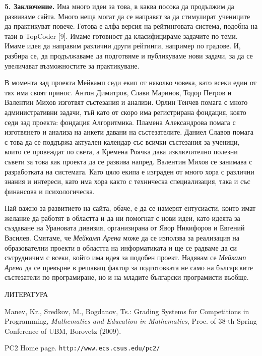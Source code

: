 \documentclass[11pt]{article}
\begin{document}
\textbf{5. Заключение.} Има много идеи за това, в каква посока да
продължим да развиваме сайта. Много неща могат да се направят за да
стимулират учениците да практикуват повече. Готова е алфа версия на
рейтинговата система, подобна на тази в TopCoder [9]. Имаме
готовност да класифицираме задачите по теми. Имаме идея да направим
различни други рейтинги, например по градове. И, разбира се, да
продължаваме да подготвяме и публикуваме нови задачи, за да се
увеличават възможностите за практикуване.

В момента зад проекта Мейкамп седи екип от няколко човека, като всеки
един от тях има своят принос. Антон Димитров, Слави Маринов, Тодор Петров
и Валентин Михов изготвят състезания и анализи. Орлин Тенчев помага с много
административни задачи, тъй като от скоро има регистрирана фондация, която
седи зад проекта: фондация Алгоритмика. Пламена Александрова помага с
изготвянето и анализа на анкети давани на състезателите. Даниел Славов помага с това да се поддържа актуален календар със всички състезания за ученици, които се провеждат по света, а Кремена Роячка дава изключително полезни съвети за това как проекта да се развива напред. Валентин Михов се занимава с разработката на системата. Като цяло екипа е изграден от много хора с различни знания и интереси, като има хора както с техническа специализация, така и със финансова и психологическа.

Най-важно за развитието на сайта, обаче, е да се намерят ентусиасти,
които имат желание да работят в областта и да ни помогнат с нови
идеи, като идеята за създаване на Урановата дивизия, организирана от Явор Никифоров и Евгений Василев.
Смятаме, че \textit{Мейкамп Арена} може да се използва за реализация
на образователни проекти в областта на информатиката и ще се радваме
да си сътрудничим с всеки, който има идея за подобен проект. Надявам
се \textit{Мейкамп Арена} да се превърне в решаващ фактор за
подготовката не само на българските състезатели по програмиране, но
и на младите български програмисти въобще.

\begin{center}

ЛИТЕРАТУРА

\end{center}

\noindent [1] Manev, Kr.,  Sredkov, M., Bogdanov, Ts.: Grading
Systems for Competiti\-ons in Programming, \textit{Mathematics and
Education in Mathematics}, Proc. of 38-th Spring Conference of UBM,
Borovetz (2009).

\noindent [2] PC2 Home page. \texttt{http://www.ecs.csus.edu/pc2/}
\end{document}
